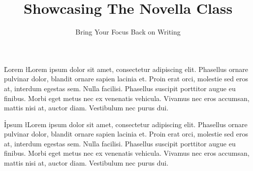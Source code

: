 \documentclass{novella}
\title     {Showcasing The Novella Class}
\subtitle  {Bring Your Focus Back on Writing}
\begin{document}
\h{Lorem}
\l{L}orem ipsum dolor sit amet, consectetur adipiscing elit. Phasellus ornare pulvinar dolor, blandit ornare sapien lacinia et. Proin erat orci, molestie sed eros at, interdum egestas sem. Nulla facilisi. Phasellus suscipit porttitor augue eu finibus. Morbi eget metus nec ex venenatis vehicula. Vivamus nec eros accumsan, mattis nisi at, auctor diam. Vestibulum nec purus dui.

\lipsum[1-5]

\h{Ipsum}
\l{L}orem ipsum dolor sit amet, consectetur adipiscing elit. Phasellus ornare pulvinar dolor, blandit ornare sapien lacinia et. Proin erat orci, molestie sed eros at, interdum egestas sem. Nulla facilisi. Phasellus suscipit porttitor augue eu finibus. Morbi eget metus nec ex venenatis vehicula. Vivamus nec eros accumsan, mattis nisi at, auctor diam. Vestibulum nec purus dui.

\lipsum[6-8]
\end{document}
